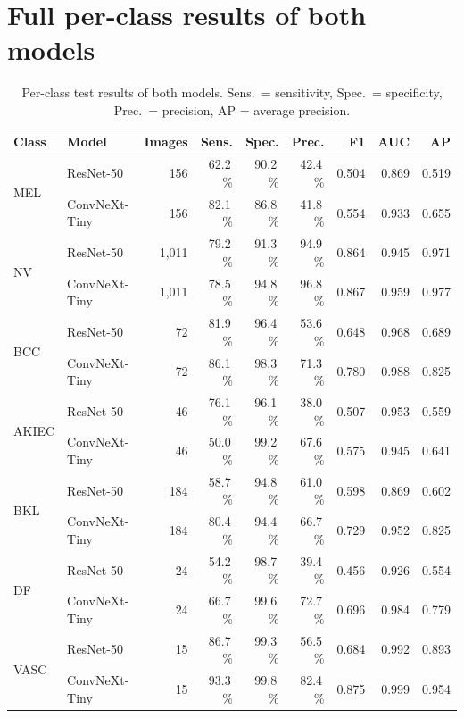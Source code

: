 \documentclass[11pt,a4paper]{article}
\newcommand{\pct}{\,\%}
\begin{document}
\section*{Full per-class results of both models}
\begin{table}[H]
\centering
\caption{Per-class test results of both models. Sens.\ = sensitivity, Spec.\ = specificity, Prec.\ = precision, AP = average precision.}
\small
\begin{tabular}{@{}llrrrrrrr@{}}
\toprule
Class & Model & Images & Sens. & Spec. & Prec. & F1 & AUC & AP \\
\midrule
\multirow{2}{*}{MEL} & ResNet-50 & 156 & 62.2\pct & 90.2\pct & 42.4\pct & 0.504 & 0.869 & 0.519 \\
 & ConvNeXt-Tiny & 156 & 82.1\pct & 86.8\pct & 41.8\pct & 0.554 & 0.933 & 0.655 \\
\midrule
\multirow{2}{*}{NV} & ResNet-50 & 1,011 & 79.2\pct & 91.3\pct & 94.9\pct & 0.864 & 0.945 & 0.971 \\
 & ConvNeXt-Tiny & 1,011 & 78.5\pct & 94.8\pct & 96.8\pct & 0.867 & 0.959 & 0.977 \\
\midrule
\multirow{2}{*}{BCC} & ResNet-50 & 72 & 81.9\pct & 96.4\pct & 53.6\pct & 0.648 & 0.968 & 0.689 \\
 & ConvNeXt-Tiny & 72 & 86.1\pct & 98.3\pct & 71.3\pct & 0.780 & 0.988 & 0.825 \\
\midrule
\multirow{2}{*}{AKIEC} & ResNet-50 & 46 & 76.1\pct & 96.1\pct & 38.0\pct & 0.507 & 0.953 & 0.559 \\
 & ConvNeXt-Tiny & 46 & 50.0\pct & 99.2\pct & 67.6\pct & 0.575 & 0.945 & 0.641 \\
\midrule
\multirow{2}{*}{BKL} & ResNet-50 & 184 & 58.7\pct & 94.8\pct & 61.0\pct & 0.598 & 0.869 & 0.602 \\
 & ConvNeXt-Tiny & 184 & 80.4\pct & 94.4\pct & 66.7\pct & 0.729 & 0.952 & 0.825 \\
\midrule
\multirow{2}{*}{DF} & ResNet-50 & 24 & 54.2\pct & 98.7\pct & 39.4\pct & 0.456 & 0.926 & 0.554 \\
 & ConvNeXt-Tiny & 24 & 66.7\pct & 99.6\pct & 72.7\pct & 0.696 & 0.984 & 0.779 \\
\midrule
\multirow{2}{*}{VASC} & ResNet-50 & 15 & 86.7\pct & 99.3\pct & 56.5\pct & 0.684 & 0.992 & 0.893 \\
 & ConvNeXt-Tiny & 15 & 93.3\pct & 99.8\pct & 82.4\pct & 0.875 & 0.999 & 0.954 \\
\bottomrule
\end{tabular}
\end{table}
\end{document}
